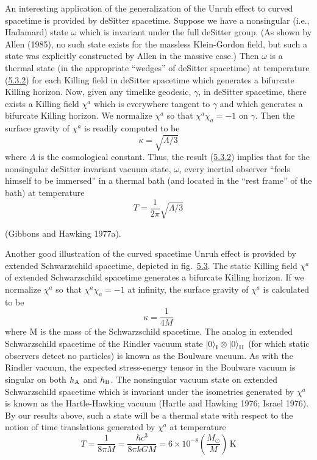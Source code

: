 \documentclass[11pt,a4paper]{article}
\providecommand{\ket}[1]{\left\lvert#1\right\rangle}
\begin{document}
An interesting application of the generalization of the Unruh effect to curved spacetime is provided by deSitter spacetime. Suppose we have a nonsingular (i.e., Hadamard) state \(\omega\) which is invariant under the full deSitter group. (As shown by Allen (1985), no such state exists for the massless Klein-Gordon field, but such a state was explicitly constructed by Allen in the massive case.) Then \(\omega\) is a thermal state (in the appropriate ``wedges'' of deSitter spacetime) at temperature (\hyperref[eq:5.3.2]{5.3.2}) for each Killing field in deSitter spacetime which generates a bifurcate Killing horizon. Now, given any timelike geodesic, \(\gamma\), in deSitter spacetime, there exists a Killing field \(\chi^a\) which is everywhere tangent to \(\gamma\) and which generates a bifurcate Killing horizon. We normalize \(\chi^a\) so that \(\chi^a\chi_a=-1\) on \(\gamma\). Then the surface gravity of \(\chi^a\) is readily computed to be
\begin{equation*}
\kappa = \sqrt{\Lambda/3} \tag{5.3.4}\label{eq:5.3.4}
\end{equation*}
where \(\Lambda\) is the cosmological constant. Thus, the result (\hyperref[eq:5.3.2]{5.3.2}) implies that for the nonsingular deSitter invariant vacuum state, \(\omega\), every inertial observer ``feels himself to be immersed'' in a thermal \hypertarget{source-141}{} bath (and located in the ``rest frame'' of the bath) at temperature
\begin{equation*}
T = \frac{1}{2\pi} \sqrt{\Lambda/3} \tag{5.3.5}\label{eq:5.3.5}
\end{equation*}

(Gibbons and Hawking 1977a).

Another good illustration of the curved spacetime Unruh effect is provided by extended Schwarzschild spacetime, depicted in fig.~\hyperref[fig:5.3]{5.3}. The static Killing field \(\chi^a\) of extended Schwarzschild spacetime generates a bifurcate Killing horizon. If we normalize \(\chi^a\) so that \(\chi^a\chi_a=-1\) at infinity, the surface gravity of \(\chi^a\) is calculated to be
\begin{equation*}
\kappa = \frac{1}{4M} \tag{5.3.6}\label{eq:5.3.6}
\end{equation*}
where M is the mass of the Schwarzschild spacetime. The analog in extended Schwarzschild spacetime of the Rindler vacuum state \(\ket{0}_{\rm I}\otimes \ket{0}_{\rm II}\) (for which static observers detect no particles) is known as the Boulware vacuum. As with the Rindler vacuum, the expected stress-energy tensor in the Boulware vacuum is singular on both \(h_{\rm A}\) and \(h_{\rm B}\). The nonsingular vacuum state on extended Schwarzschild spacetime which is invariant under the isometries generated by \(\chi^a\) is known as the Hartle-Hawking vacuum (Hartle and Hawking 1976; Israel 1976). By our results above, such a state will be a thermal state with respect to the notion of time translations generated by \(\chi^a\) at temperature
\begin{equation*}
T = \frac{1}{8\pi M} = \frac{\hbar c^3}{8\pi kGM} = 6 \times 10^{-8} \left(\frac{M_\odot}{M}\right) \,\mathrm K \tag{5.3.7}\label{eq:5.3.7}
\end{equation*}
\end{document}
